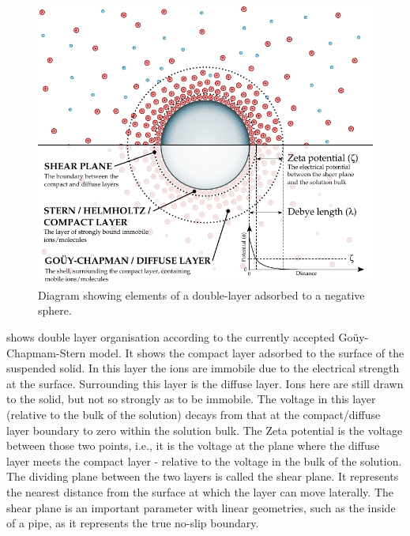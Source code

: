     \begin{figure}
      \begin{center}
        \includegraphics{content/introduction/graphics/doubleLayer_version2}
      \end{center}
      \caption{Diagram showing elements of a double-layer adsorbed to a negative sphere.}
      \label{fig:doubleLayer_anatomy}
    \end{figure}
     shows double layer organisation according to the currently accepted Goüy-Chapmam-Stern model.
    It shows the compact layer adsorbed to the surface of the suspended solid.
    In this layer the ions are immobile due to the electrical strength at the surface.
    Surrounding this layer is the diffuse layer.
    Ions here are still drawn to the solid, but not so strongly as to be immobile.
    The voltage in this layer (relative to the bulk of the solution) decays from that at the compact/diffuse layer boundary to zero within the solution bulk.
    The Zeta potential is the voltage between those two points, i.e., it is the voltage at the plane where the diffuse layer meets the compact layer - relative to the voltage in the bulk of the solution.
    The dividing plane between the two layers is called the shear plane.
    It represents the nearest distance from the surface at which the layer can move laterally.
    The shear plane is an important parameter with linear geometries, such as the inside of a pipe, as it represents the true no-slip boundary.

